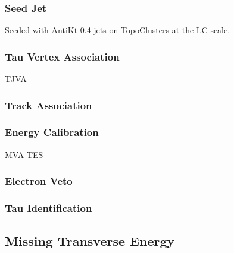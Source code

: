 \subsubsection{Seed Jet}

Seeded with AntiKt 0.4 jets on TopoClusters at the LC scale.

\subsubsection{Tau Vertex Association}

TJVA

\subsubsection{Track Association}

\cite{duschinger}


\subsubsection{Energy Calibration}

MVA TES

\subsubsection{Electron Veto}
\subsubsection{Tau Identification}

\subsection{Missing Transverse Energy}%
\label{sec:atlas_met}


